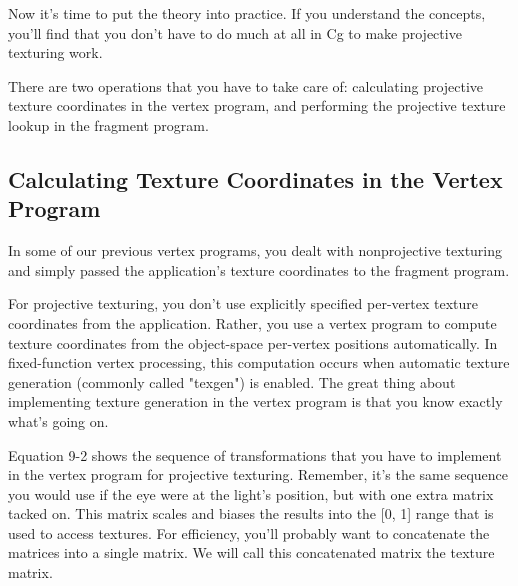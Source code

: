 \documentclass[../main.tex]{subfiles}
\begin{document}
Now it's time to put the theory into practice. If you understand the concepts, you'll find that you don't have to do much at all in Cg to make projective texturing work.

There are two operations that you have to take care of: calculating projective texture coordinates in the vertex program, and performing the projective texture lookup in the fragment program.

\subsection*{Calculating Texture Coordinates in the Vertex Program}

In some of our previous vertex programs, you dealt with nonprojective texturing and simply passed the application's texture coordinates to the fragment program.

For projective texturing, you don't use explicitly specified per-vertex texture coordinates from the application. Rather, you use a vertex program to compute texture coordinates from the object-space per-vertex positions automatically. In fixed-function vertex processing, this computation occurs when automatic texture generation (commonly called "texgen") is enabled. The great thing about implementing texture generation in the vertex program is that you know exactly what's going on.

Equation 9-2 shows the sequence of transformations that you have to implement in the vertex program for projective texturing. Remember, it's the same sequence you would use if the eye were at the light's position, but with one extra matrix tacked on. This matrix scales and biases the results into the [0, 1] range that is used to access textures. For efficiency, you'll probably want to concatenate the matrices into a single matrix. We will call this concatenated matrix the texture matrix.
\end{document}
